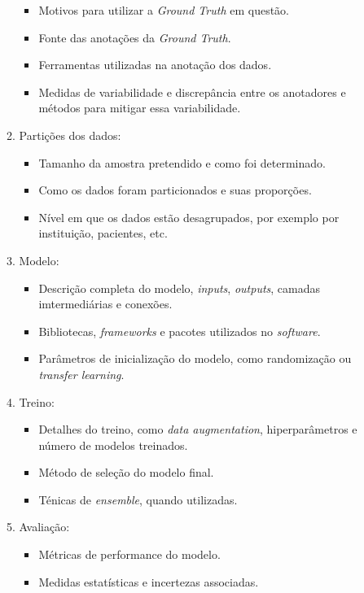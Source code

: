 \begin{enumerate}
\begin{enumerate}
\begin{itemize}
            \item Motivos para utilizar a \textit{Ground Truth} em questão.
            \item Fonte das anotações da \textit{Ground Truth}.
            \item Ferramentas utilizadas na anotação dos dados.
            \item Medidas de variabilidade e discrepância entre os anotadores e métodos para mitigar essa variabilidade.
        \end{itemize}
        \item Partições dos dados:
        \begin{itemize}
            \item Tamanho da amostra pretendido e como foi determinado.
            \item Como os dados foram particionados e suas proporções.
            \item Nível em que os dados estão desagrupados, por exemplo por instituição, pacientes, etc.
        \end{itemize}
        \item Modelo:
        \begin{itemize}
            \item Descrição completa do modelo, \textit{inputs}, \textit{outputs}, camadas imtermediárias e conexões.
            \item Bibliotecas, \textit{frameworks} e pacotes utilizados no \textit{software}.
            \item Parâmetros de inicialização do modelo, como randomização ou \textit{transfer learning}.
        \end{itemize}
        \item Treino:
        \begin{itemize}
            \item Detalhes do treino, como \textit{data augmentation}, hiperparâmetros e número de modelos treinados.
            \item Método de seleção do modelo final.
            \item Ténicas de \textit{ensemble}, quando utilizadas.
        \end{itemize}
        \item Avaliação:
        \begin{itemize}
            \item Métricas de performance do modelo.
            \item Medidas estatísticas e incertezas associadas.

\end{itemize}
\end{enumerate}
\end{enumerate}
